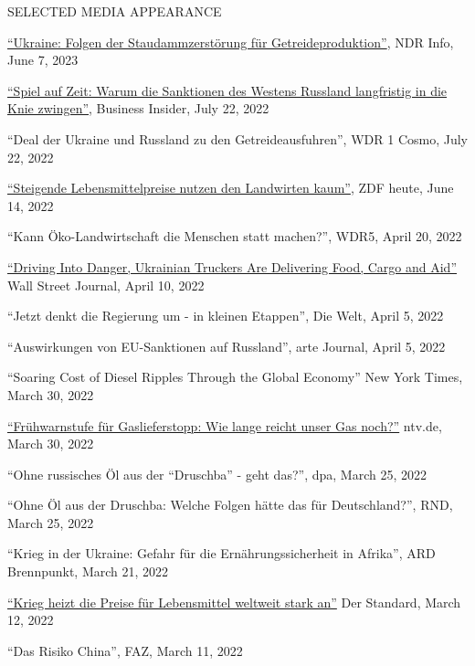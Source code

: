 \documentclass{article}
\begin{document}

\begin{minipage}[t]{0.12\textwidth}
    {\selectfont SELECTED MEDIA \mbox APPEARANCE} \\
\end{minipage}
\hspace{5mm}
\begin{minipage}[t]{0.8\textwidth}
    \href{https://www.ndr.de/nachrichten/info/Wirtschaft-Folgen-der-Staudammzerstoerung-fuer-Getreideproduktion,audio1398696.html}{``Ukraine: Folgen der Staudammzerstörung für Getreideproduktion''}, NDR Info, June 7, 2023 \par
    \href{https://www.businessinsider.de/politik/welt/spiel-auf-zeit-warum-die-bundesregierung-und-experten-glauben-dass-die-sanktionen-des-westens-russland-langfristig-in-die-knie-zwingen-werden/}{``Spiel auf Zeit: Warum die Sanktionen des Westens Russland langfristig in die Knie zwingen''}, Business Insider, July 22, 2022 \par
    ``Deal der Ukraine und Russland zu den Getreideausfuhren'', WDR 1 Cosmo, July 22, 2022 \par
    \href{https://www.zdf.de/nachrichten/heute-19-uhr/bauerntag-luebeck-oezdemir-video-100.html}{``Steigende Lebensmittelpreise nutzen den Landwirten kaum''}, ZDF heute, June 14, 2022 \par
    ``Kann Öko-Landwirtschaft die Menschen statt machen?'', WDR5, April 20, 2022 \par
    \href{https://www.wsj.com/articles/driving-into-danger-ukrainian-truckers-are-delivering-food-cargo-and-aid-11649595601}{``Driving Into Danger, Ukrainian Truckers Are Delivering Food, Cargo and Aid''} Wall Street Journal, April 10, 2022 \par
    ``Jetzt denkt die Regierung um - in kleinen Etappen'', Die Welt, April 5, 2022 \par
    ``Auswirkungen von EU-Sanktionen auf Russland'', arte Journal, April 5, 2022 \par
    ``Soaring Cost of Diesel Ripples Through the Global Economy'' New York Times, March 30, 2022 \par
    \href{https://www.n-tv.de/wirtschaft/Wie-lange-reicht-unser-Gas-noch-article23234226.html}{``Frühwarnstufe für Gaslieferstopp: Wie lange reicht unser Gas noch?''} ntv.de, March 30, 2022 \par
    ``Ohne russisches Öl aus der ``Druschba'' - geht das?'', dpa, March 25, 2022 \par
    ``Ohne Öl aus der Druschba: Welche Folgen hätte das für Deutschland?'', RND, March 25, 2022 \par
    ``Krieg in der Ukraine: Gefahr für die Ernährungssicherheit in Afrika'', ARD Brennpunkt, March 21, 2022 \par
    \href{https://www.derstandard.de/story/2000134038874/krieg-heizt-die-preise-fuer-lebensmittel-weltweit-stark-an}{``Krieg heizt die Preise für Lebensmittel weltweit stark an''} Der Standard, March 12, 2022 \par
    ``Das Risiko China'', FAZ, March 11, 2022 \par
\end{minipage}
\end{document}
